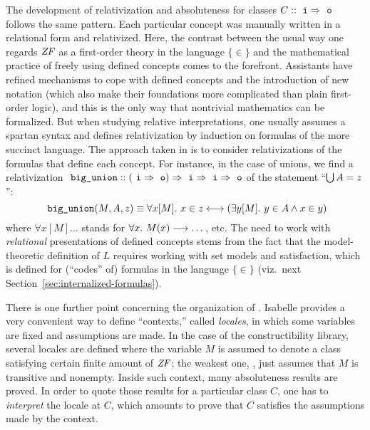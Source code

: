 The development of relativization and absoluteness for classes $C::
\isatt{i} \fun \isatt{o}$ follows the same pattern. Each particular
concept was manually written in a relational form and relativized.
Here, the contrast between the usual way one regards $\mathit{ZF}$ as a
first-order theory in the language $\{\in \}$ and the mathematical
practice of freely using defined concepts comes to the
forefront. Assistants have refined mechanisms to cope with defined
concepts and the introduction of new notation (which also make their foundations more complicated
than plain first-order logic), and this is the only way that nontrivial
mathematics can be formalized. But when studying relative interpretations, one
usually assumes a spartan syntax and defines relativization by
induction on formulas of the more succinct language. The approach
taken in  is to consider relativizations of
the formulas that define each concept. For instance,
in the case of unions, we find a relativization
$\isatt{big{\uscore}union}:: (\isatt{i} \fun \isatt{o}) \fun \isatt{i}
\fun \isatt{i} \fun \isatt{o}$ of the statement
“$\mathop{\textstyle\bigcup} A = z$”:
\[
 \isatt{big{\uscore}union}(M,A,z) \equiv \forall x[M].\ x \in z
 \longleftrightarrow (\exists y[M].\ y \in A \land x \in y)
\]
where $\forall x[M]\dots$ stands for $\forall x.\ M(x)\longrightarrow \dots$,
etc. The need to work with \emph{relational} presentations of defined
concepts stems from the fact that the model-theoretic definition of
$L$ requires working with set models and satisfaction, which is
defined for (“codes” of) formulas in the language $\{\in \}$
(viz.\ next Section~\ref{sec:internalized-formulas}).

There is one further point concerning the organization of
. Isabelle provides a very convenient way to
define “contexts,” called \emph{locales}, in which some variables are
fixed and assumptions are made. In the case of the constructibility
library, several locales are defined where the variable $M$ is assumed to
denote a class satisfying certain finite amount of $\mathit{ZF}$; the weakest
one,  \cite[Sect.~3]{2020arXiv200109715G}, just
assumes that $M$ is transitive and nonempty. Inside such context, many
absoluteness results are proved. In order to quote those results for a
particular class $C$, one has to \emph{interpret} the locale at
$C$, which amounts to prove that $C$ satisfies the assumptions made by
the context.

